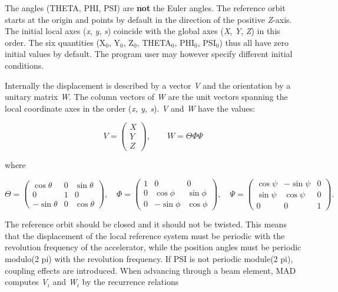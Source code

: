 The angles (THETA, PHI, PSI) are \textbf{not} the Euler angles. The
reference orbit starts at the origin and points by default in the
direction of the positive \textit{Z}-axis. The initial local axes
(\textit{x}, \textit{y}, \textit{s})  coincide with the global axes
(\textit{X}, \textit{Y}, \textit{Z}) in this order. The six quantities
(X$_0$, Y$_0$, Z$_0$, THETA$_0$, PHI$_0$, PSI$_0$) thus all have zero
initial values by default. The program user may however specify
different initial conditions.  

Internally the displacement is described by a vector \textit{V} and the
orientation by a unitary matrix \textit{W}. The column vectors of
\textit{W} are the unit vectors spanning  the local coordinate axes in
the order (\textit{x, y, s}). \textit{V} and \textit{W} have the values:  


\[
V =
 \begin{pmatrix}
  X \\
  Y \\
  Z
 \end{pmatrix}
, \quad\quad
W=\Theta\Phi\Psi
\]

 where 

\[
\Theta =
 \begin{pmatrix}
  \cos \theta  & 0 &  \sin \theta \\
  0            & 1 &  0 \\
  -\sin \theta & 0 &  \cos \theta
 \end{pmatrix}
, \quad
\Phi =
 \begin{pmatrix}
  1 & 0          &  0 \\
  0 & \cos \phi  &  \sin \phi \\
  0 & -\sin \phi &  \cos \phi
 \end{pmatrix}
, \quad
\Psi =
 \begin{pmatrix}
  \cos \psi &  -\sin \psi & 0 \\
  \sin \psi &  \cos \psi  & 0 \\
  0	    &	0	  & 1 
 \end{pmatrix}
.
\]

The reference orbit should be closed and it should not be twisted. This
means that the displacement of the local reference system must be
periodic with the revolution frequency of the accelerator, while the
position angles must be periodic modulo(2 pi) with the revolution
frequency. If PSI is not periodic module(2 pi), coupling effects are
introduced. When advancing through a beam element, MAD computes
\textit{V$_i$} and \textit{W$_i$} by the recurrence relations  

